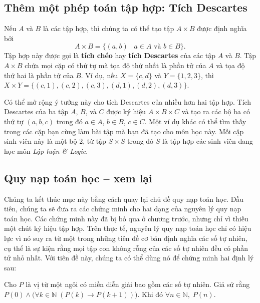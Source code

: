 \subsection{Thêm một phép toán tập hợp: Tích Descartes}

Nếu $A$ và $B$ là các tập hợp, thì chúng ta có thể tạo tập $A \times B$ được định nghĩa bởi
\[
A \times B = \{(a, b) \mid a \in A \text{ và } b \in B\}.
\]
Tập hợp này được gọi là \textbf{tích chéo} hay \textbf{tích Descartes} của các tập $A$ và $B$. Tập $A \times B$ chứa mọi cặp có thứ tự mà tọa độ thứ nhất là phần tử của $A$ và tọa độ thứ hai là phần tử của $B$. Ví dụ, nếu $X = \{c, d\}$ và $Y = \{1, 2, 3\}$, thì $X \times Y = \{(c,1), (c,2), (c,3), (d,1), (d,2), (d,3)\}$.

Có thể mở rộng ý tưởng này cho tích Descartes của nhiều hơn hai tập hợp. Tích Descartes của ba tập $A$, $B$, và $C$ được ký hiệu $A \times B \times C$ và tạo ra các bộ ba có thứ tự $(a, b, c)$ trong đó $a \in A$, $b \in B$, $c \in C$. Một ví dụ khác có thể tìm thấy trong các cặp bạn cùng làm bài tập mà bạn đã tạo cho môn học này. Mỗi cặp sinh viên này là một bộ 2, từ tập $S \times S$ trong đó $S$ là tập hợp các sinh viên đang học môn \textit{Lập luận \& Logic}.

\subsection{Quy nạp toán học -- xem lại}

Chúng ta kết thúc mục này bằng cách quay lại chủ đề quy nạp toán học. Đầu tiên, chúng ta sẽ đưa ra các chứng minh cho hai dạng của nguyên lý quy nạp toán học. Các chứng minh này đã bị bỏ qua ở chương trước, nhưng chỉ vì thiếu một chút ký hiệu tập hợp. Trên thực tế, nguyên lý quy nạp toán học chỉ có hiệu lực vì nó suy ra từ một trong những tiên đề cơ bản định nghĩa các số tự nhiên, cụ thể là sự kiện rằng mọi tập con không rỗng của các số tự nhiên đều có phần tử nhỏ nhất. Với tiên đề này, chúng ta có thể dùng nó để chứng minh hai định lý sau:

\begin{theorem}
\label{thm:4.3}
Cho $P$ là vị từ một ngôi có miền diễn giải bao gồm các số tự nhiên. Giả sử rằng $P(0) \land \bigl(\forall k \in \mathbb{N}\;(P(k) \to P(k+1))\bigr)$. Khi đó $\forall n \in \mathbb{N},\; P(n)$.
\end{theorem}

